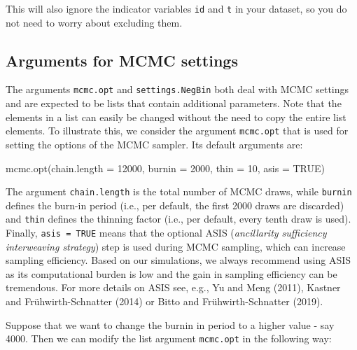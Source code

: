 \documentclass[a4paper, preprint, 3p,
authoryear]{elsarticle} %
\newenvironment{Shaded}{\begin{snugshade}}{\end{snugshade}}
\newcommand{\NormalTok}[1]{#1}
\begin{document}
This will also ignore the indicator variables \texttt{id} and \texttt{t}
in your dataset, so you do not need to worry about excluding them.

\subsection{Arguments for MCMC
settings}\label{arguments-for-mcmc-settings}

The arguments \texttt{mcmc.opt} and \texttt{settings.NegBin} both deal
with MCMC settings and are expected to be lists that contain additional
parameters. Note that the elements in a list can easily be changed
without the need to copy the entire list elements. To illustrate this,
we consider the argument \texttt{mcmc.opt} that is used for setting the
options of the MCMC sampler. Its default arguments are:

\begin{Shaded}
\begin{Highlighting}[]
\NormalTok{mcmc.opt(chain.length = 12000, burnin = 2000, thin = 10, asis = TRUE)}
\end{Highlighting}
\end{Shaded}

The argument \texttt{chain.length} is the total number of MCMC draws,
while \texttt{burnin} defines the burn-in period (i.e., per default, the
first 2000 draws are discarded) and \texttt{thin} defines the thinning
factor (i.e., per default, every tenth draw is used). Finally,
\texttt{asis = TRUE} means that the optional ASIS
(\textit{ancillarity sufficiency interweaving strategy}) step is used
during MCMC sampling, which can increase sampling efficiency. Based on
our simulations, we always recommend using ASIS as its computational
burden is low and the gain in sampling efficiency can be tremendous. For
more details on ASIS see, e.g., Yu and Meng (2011), Kastner and
Frühwirth-Schnatter (2014) or Bitto and Frühwirth-Schnatter (2019).

Suppose that we want to change the burnin in period to a higher value -
say 4000. Then we can modify the list argument \texttt{mcmc.opt} in the
following way:

\begin{Shaded}
\end{Shaded}
\end{document}
